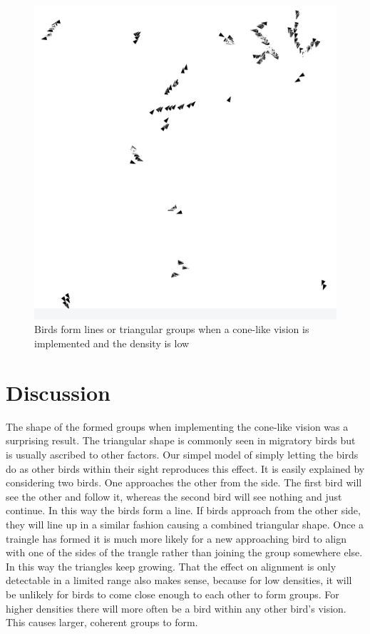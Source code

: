 \documentclass[twoside,twocolumn]{article}
\begin{document}
\begin{figure}[!htb]
\begin{center}
\includegraphics[width=\columnwidth]{angles}
\end{center}
\caption{Birds form lines or triangular groups when a cone-like vision is implemented and the density is low}\label{fig:angle-birds}
\end{figure}

\section{Discussion}

The shape of the formed groups when implementing the cone-like vision was a surprising result.
The triangular shape is commonly seen in migratory birds but is usually ascribed to other factors.
Our simpel model of simply letting the birds do as other birds within their sight reproduces this
effect. It is easily explained by considering two birds. One approaches the other from the side.
The first bird will see the other and follow it, whereas the second bird will see nothing and just
continue. In this way the birds form a line. If birds approach from the other side, they will line
up in a similar fashion causing a combined triangular shape. Once a traingle has formed it is much
more likely for a new approaching bird to align with one of the sides of the trangle rather than
joining the group somewhere else. In this way the triangles keep growing.
That the effect on alignment is only detectable in a limited range also makes sense, because for
low densities, it will be unlikely for birds to come close enough to each other to form groups.
For higher densities there will more often be a bird within any other bird's vision. This causes
larger, coherent groups to form.
\end{document}
